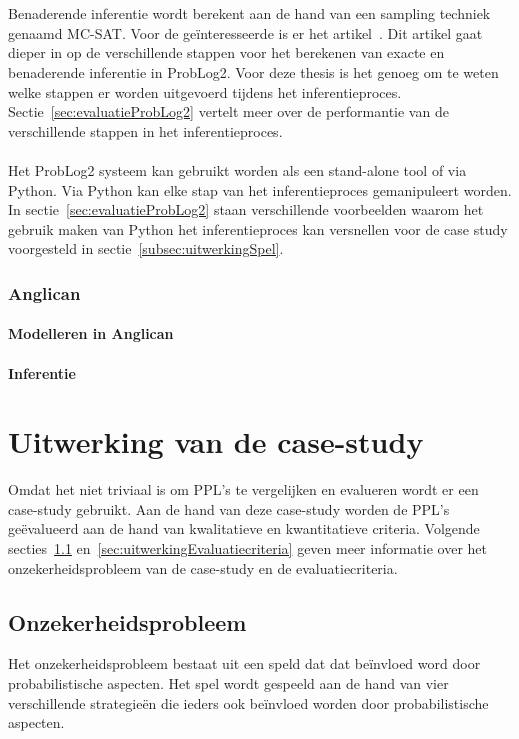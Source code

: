 \documentclass[12pt,a4paper,oneside]{book}
\theoremstyle{definition}
\begin{document}
\\\\
Benaderende inferentie wordt berekent aan de hand van een sampling techniek genaamd MC-SAT. Voor de ge\"{i}nteresseerde is er het artikel~\cite{plpinferencelearningwbf}. Dit artikel gaat dieper in op de verschillende stappen voor het berekenen van exacte en benaderende inferentie in ProbLog2. Voor deze thesis is het genoeg om te weten welke stappen er worden uitgevoerd tijdens het inferentieproces. Sectie~\ref{sec:evaluatieProbLog2} vertelt meer over de performantie van de verschillende stappen in het inferentieproces.
\\\\
Het ProbLog2 systeem kan gebruikt worden als een stand-alone tool of via Python. Via Python kan elke stap van het inferentieproces gemanipuleert worden. In sectie~\ref{sec:evaluatieProbLog2} staan verschillende voorbeelden waarom het gebruik maken van Python het inferentieproces kan versnellen voor de case study voorgesteld in sectie~\ref{subsec:uitwerkingSpel}.
\subsection{Anglican}
\label{sec:Anglican}
\subsubsection{Modelleren in Anglican}
\label{subsubsec:ModellerenInAnglican}
\subsubsection{Inferentie}
\label{subsubsec:InferentieAnglican}


\chapter{Uitwerking van de case-study}
Omdat het niet triviaal is om PPL's te vergelijken en evalueren wordt er een case-study gebruikt. Aan de hand van deze case-study worden de PPL's ge\"{e}valueerd aan de hand van kwalitatieve en kwantitatieve criteria. Volgende secties~\ref{sec:uitwerkingProblem} en~\ref{sec:uitwerkingEvaluatiecriteria} geven meer informatie over het onzekerheidsprobleem van de case-study en de evaluatiecriteria.
\section{Onzekerheidsprobleem}
\label{sec:uitwerkingProblem}
Het onzekerheidsprobleem bestaat uit een speld dat dat be\"{i}nvloed word door probabilistische aspecten. Het spel wordt gespeeld aan de hand van vier verschillende strategie\"{e}n die ieders ook be\"{i}nvloed worden door probabilistische aspecten.
\end{document}
